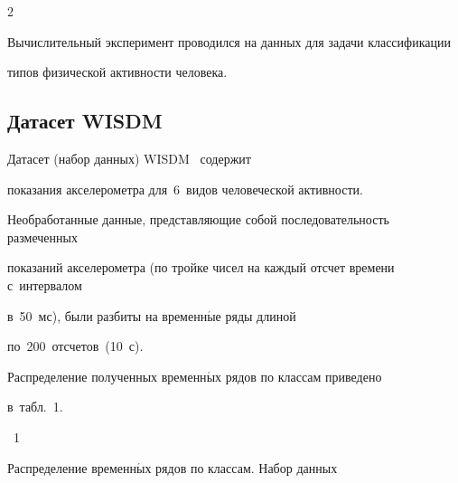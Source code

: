 \begin{multicols}{2}





\vspace*{-2pt}





Вычислительный эксперимент проводился на данных для задачи классификации 


типов физической активности человека.





\vspace*{-6pt}





\subsection{Датасет WISDM}





\vspace*{-2pt}





Датасет (набор данных) WISDM~\cite{Kwapisz:2011:ARU:1964897.1964918} содержит 


показания акселерометра для~6~видов человеческой активности.


Необработанные данные, пред\-став\-ля\-ющие собой последовательность размеченных 


показаний акселерометра (по тройке чисел на каждый отсчет времени с~интервалом 


в~50~мс), были разбиты на временн$\acute{\mbox{ы}}$е ряды длиной 


по~200~отсчетов~(10~с).


Распределение полученных временн$\acute{\mbox{ы}}$х рядов по классам приведено 


в~табл.~1.





\vspace*{12pt}





\noindent






{{\tablename~1}\ \ \small{Распределение временн$\acute{\mbox{ы}}$х рядов по классам. Набор данных


}}
\end{multicols}
